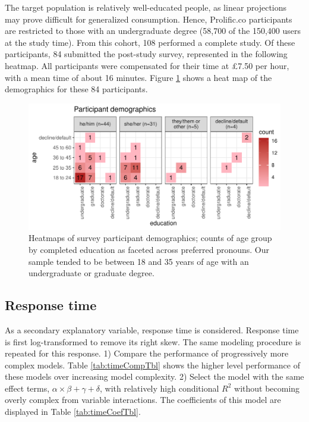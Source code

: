 \documentclass[
]{article}
\begin{document}
The target population is relatively well-educated people, as linear projections may prove difficult for generalized consumption. Hence, Prolific.co participants are restricted to those with an undergraduate degree (58,700 of the 150,400 users at the study time). From this cohort, 108 performed a complete study. Of these participants, 84 submitted the post-study survey, represented in the following heatmap. All participants were compensated for their time at \pounds 7.50 per hour, with a mean time of about 16 minutes. Figure \ref{fig:figSurveyDemographics} shows a heat map of the demographics for these 84 participants.

\begin{figure}

{\centering \includegraphics[width=1\linewidth]{./figures/figSurveyDemographics} 

}

\caption{Heatmaps of survey participant demographics; counts of age group by completed education as faceted across preferred pronouns. Our sample tended to be between 18 and 35 years of age with an undergraduate or graduate degree.}\label{fig:figSurveyDemographics}
\end{figure}

\hypertarget{sec:responsetime}{%
\subsection{Response time}\label{sec:responsetime}}

As a secondary explanatory variable, response time is considered. Response time is first log-transformed to remove its right skew. The same modeling procedure is repeated for this response. 1) Compare the performance of progressively more complex models. Table \ref{tab:timeCompTbl} shows the higher level performance of these models over increasing model complexity. 2) Select the model with the same effect terms, \(\alpha \times \beta + \gamma + \delta\), with relatively high conditional \(R^2\) without becoming overly complex from variable interactions. The coefficients of this model are displayed in Table \ref{tab:timeCoefTbl}.
\end{document}
